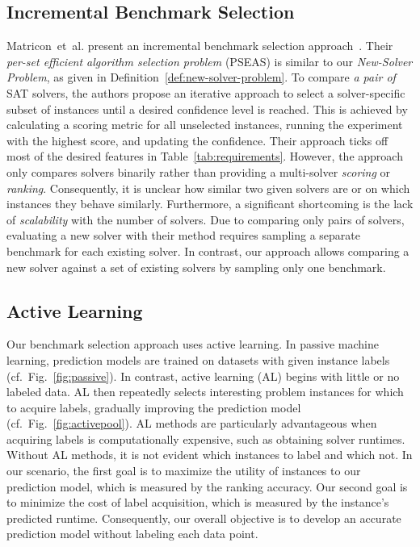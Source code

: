 \documentclass[sn-basic, Numbered]{sn-jnl} %
\begin{document}
\subsection{Incremental Benchmark Selection}
\label{sec:related:incremental-selection}

Matricon~et~al. present an incremental benchmark selection approach~\cite{MatriconAFSH21}.
Their \emph{per-set efficient algorithm selection problem} (PSEAS) is similar to our \emph{New-Solver Problem}, as given in Definition~\ref{def:new-solver-problem}.
To compare \emph{a pair of} SAT solvers, the authors propose an iterative approach to select a solver-specific subset of instances until a desired confidence level is reached.
This is achieved by calculating a scoring metric for all unselected instances, running the experiment with the highest score, and updating the confidence.
Their approach ticks off most of the desired features in Table~\ref{tab:requirements}.
However, the approach only compares solvers binarily rather than providing a multi-solver \emph{scoring} or \emph{ranking}.
Consequently, it is unclear how similar two given solvers are or on which instances they behave similarly.
Furthermore, a significant shortcoming is the lack of \emph{scalability} with the number of solvers.
Due to comparing only pairs of solvers, evaluating a new solver with their method requires sampling a separate benchmark for each existing solver.
In contrast, our approach allows comparing a new solver against a set of existing solvers by sampling only one benchmark.

\subsection{Active Learning}
\label{sec:related:active-learning}

Our benchmark selection approach uses active learning.
In passive machine learning, prediction models are trained on datasets with given instance labels (cf.~Fig.~\ref{fig:passive}).
In contrast, active learning (AL) begins with little or no labeled data.
AL then repeatedly selects interesting problem instances for which to acquire labels, gradually improving the prediction model (cf.~Fig.~\ref{fig:activepool}).
AL methods are particularly advantageous when acquiring labels is computationally expensive, such as obtaining solver runtimes.
Without AL methods, it is not evident which instances to label and which not.
In our scenario, the first goal is to maximize the utility of instances to our prediction model, which is measured by the ranking accuracy.
Our second goal is to minimize the cost of label acquisition, which is measured by the instance's predicted runtime.
Consequently, our overall objective is to develop an accurate prediction model without labeling each data point.
\end{document}
